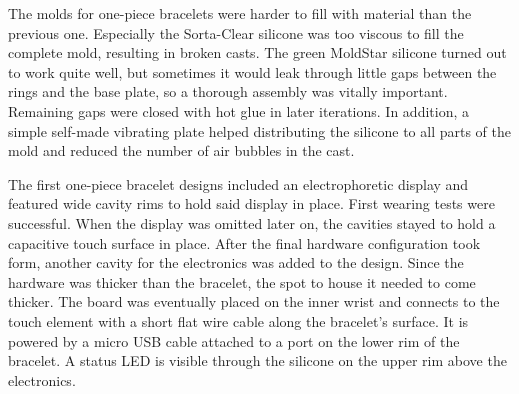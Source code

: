 The molds for one-piece bracelets were harder to fill with material than the previous one. Especially the Sorta-Clear silicone was too viscous to fill the complete mold, resulting in broken casts. The green MoldStar silicone turned out to work quite well, but sometimes it would leak through little gaps between the rings and the base plate, so a thorough assembly was vitally important. Remaining gaps were closed with hot glue in later iterations. In addition, a simple self-made vibrating plate helped distributing the silicone to all parts of the mold and reduced the number of air bubbles in the cast. 

The first one-piece bracelet designs included an electrophoretic display and featured wide cavity rims to hold said display in place. First wearing tests were successful. When the display was omitted later on, the cavities stayed to hold a capacitive touch surface in place. After the final hardware configuration took form, another cavity for the electronics was added to the design. Since the hardware was thicker than the bracelet, the spot to house it needed to come thicker. The board was eventually placed on the inner wrist and connects to the touch element with a short flat wire cable along the bracelet's surface. It is powered by a micro USB cable attached to a port on the lower rim of the bracelet. A status \ac{LED} is visible through the silicone on the upper rim above the electronics.

